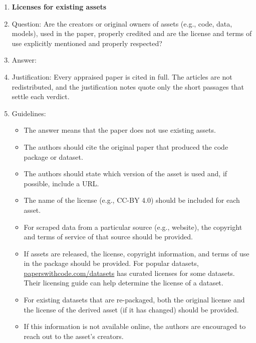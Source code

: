 \documentclass{article}
\begin{document}
\begin{enumerate}
\item {\bf Licenses for existing assets}
    \item[] Question: Are the creators or original owners of assets (e.g., code, data, models), used in the paper, properly credited and are the license and terms of use explicitly mentioned and properly respected?
    \item[] Answer: \answerYes{}
    \item[] Justification: Every appraised paper is cited in full. The articles are not redistributed, and the justification notes quote only the short passages that settle each verdict.
    \item[] Guidelines:
    \begin{itemize}
        \item The answer \answerNA{} means that the paper does not use existing assets.
        \item The authors should cite the original paper that produced the code package or dataset.
        \item The authors should state which version of the asset is used and, if possible, include a URL.
        \item The name of the license (e.g., CC-BY 4.0) should be included for each asset.
        \item For scraped data from a particular source (e.g., website), the copyright and terms of service of that source should be provided.
        \item If assets are released, the license, copyright information, and terms of use in the package should be provided. For popular datasets, \url{paperswithcode.com/datasets} has curated licenses for some datasets. Their licensing guide can help determine the license of a dataset.
        \item For existing datasets that are re-packaged, both the original license and the license of the derived asset (if it has changed) should be provided.
        \item If this information is not available online, the authors are encouraged to reach out to the asset's creators.
    \end{itemize}


\end{enumerate}
\end{document}
